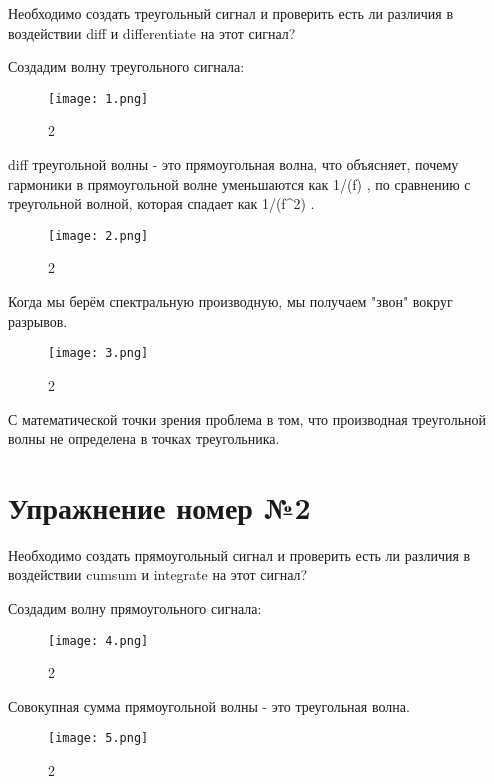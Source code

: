 \documentclass[10pt,a4paper,oneside]{article}
\begin{document}
Необходимо создать треугольный сигнал и проверить есть ли различия в воздействии diff и differentiate на этот сигнал? 

Создадим волну треугольного сигнала:

\begin{figure}[H]
        \centering
        \texttt{[image: 1.png]}
        \caption{2}
        \label{fig:first}
\end{figure}

diff треугольной волны - это прямоугольная волна, что объясняет, почему гармоники в прямоугольной волне уменьшаются как 1/(f) , по сравнению с треугольной волной, которая спадает как 1/(f^2) .

\begin{figure}[H]
        \centering
        \texttt{[image: 2.png]}
        \caption{2}
        \label{fig:first}
\end{figure}

Когда мы берём спектральную производную, мы получаем "звон" вокруг разрывов.

\begin{figure}[H]
        \centering
        \texttt{[image: 3.png]}
        \caption{2}
        \label{fig:first}
\end{figure}

С математической точки зрения проблема в том, что производная треугольной волны не определена в точках треугольника.

\section{Упражнение номер №2}

Необходимо создать прямоугольный сигнал и проверить есть ли различия в воздействии cumsum и integrate на этот сигнал? 

Создадим волну прямоугольного сигнала:

\begin{figure}[H]
        \centering
        \texttt{[image: 4.png]}
        \caption{2}
        \label{fig:first}
\end{figure}

Совокупная сумма прямоугольной волны - это треугольная волна.

\begin{figure}[H]
        \centering
        \texttt{[image: 5.png]}
        \caption{2}
        \label{fig:first}
\end{figure}
\end{document}
